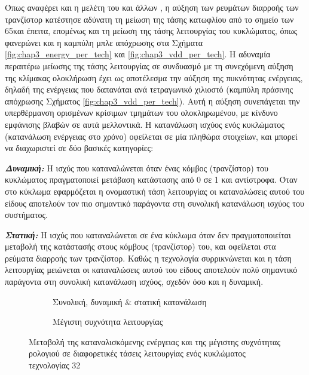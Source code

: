 Όπως αναφέρει και η μελέτη του  και άλλων \cite{pinckney2012assessing}, η αύξηση των ρευμάτων διαρροής των τρανζίστορ κατέστησε αδύνατη τη μείωση της τάσης κατωφλίου από το σημείο των 65\nm και έπειτα, επομένως και τη μείωση της τάσης λειτουργίας του κυκλώματος, όπως φανερώνει και η καμπύλη μπλε απόχρωσης στα Σχήματα \ref{fig:chap3_energy_per_tech} και \ref{fig:chap3_vdd_per_tech}. Η αδυναμία περαιτέρω μείωσης της τάσης λειτουργίας σε συνδυασμό με τη συνεχόμενη αύξηση της κλίμακας ολοκλήρωση έχει ως αποτέλεσμα την αύξηση της πυκνότητας ενέργειας, δηλαδή της ενέργειας που δαπανάται ανά τετραγωνικό χιλιοστό (καμπύλη πράσινης απόχρωσης Σχήματος \ref{fig:chap3_vdd_per_tech}). Αυτή η αύξηση συνεπάγεται την υπερθέρμανση ορισμένων κρίσιμων τμημάτων του ολοκληρωμένου, με κίνδυνο εμφάνισης βλαβών σε αυτά μελλοντικά. Η κατανάλωση ισχύος ενός κυκλώματος (κατανάλωση ενέργειας στο χρόνο) οφείλεται σε μία πληθώρα στοιχείων, και μπορεί να διαχωριστεί σε δύο βασικές κατηγορίες:
\par
\textit{\textbf{Δυναμική:}} Η ισχύς που καταναλώνεται όταν ένας κόμβος (τρανζίστορ) του κυκλώματος πραγματοποιεί μετάβαση κατάστασης από 0 σε 1 και αντίστροφα. Όταν στο κύκλωμα εφαρμόζεται η ονομαστική τάση λειτουργίας οι καταναλώσεις αυτού του είδους αποτελούν τον πιο σημαντικό παράγοντα στη συνολική κατανάλωση ισχύος του συστήματος.
\par
\textit{\textbf{Στατική:}} Η ισχύς που καταναλώνεται σε ένα κύκλωμα όταν δεν πραγματοποιείται μεταβολή της κατάστασής στους κόμβους (τρανζίστορ) του, και οφείλεται στα ρεύματα διαρροής των τρανζίστορ. Καθώς η τεχνολογία συρρικνώνεται και η τάση λειτουργίας μειώνεται οι καταναλώσεις αυτού του είδους αποτελούν πολύ σημαντικό παράγοντα στη συνολική κατανάλωση ισχύος, σχεδόν όσο και η δυναμική.\par
\par

\begin{figure}[!t]
    \centering
    \begin{subfigure}[t]{0.49\textwidth}
        \centering
        \caption{Συνολική, δυναμική $\&$ στατική κατανάλωση}
        \label{fig:chap3_energy_per_vdd}
    \end{subfigure}%
    \hfill
    \begin{subfigure}[t]{0.49\textwidth}
        \centering
        \caption{Μέγιστη συχνότητα λειτουργίας}
        \label{fig:chap3_freq_per_vdd}
    \end{subfigure}
    \caption[Μεταβολή της καταναλισκόμενης ενέργειας και της μέγιστης συχνότητας ρολογιού σε διαφορετικές τάσεις λειτουργίας ενός κυκλώματος τεχνολογίας 32\nm]{Μεταβολή της καταναλισκόμενης ενέργειας και της μέγιστης συχνότητας ρολογιού σε διαφορετικές τάσεις λειτουργίας ενός κυκλώματος τεχνολογίας 32\nm \cite{pinckney2012assessing}}
    \label{fig:chap3_Vdd}
\end{figure}


